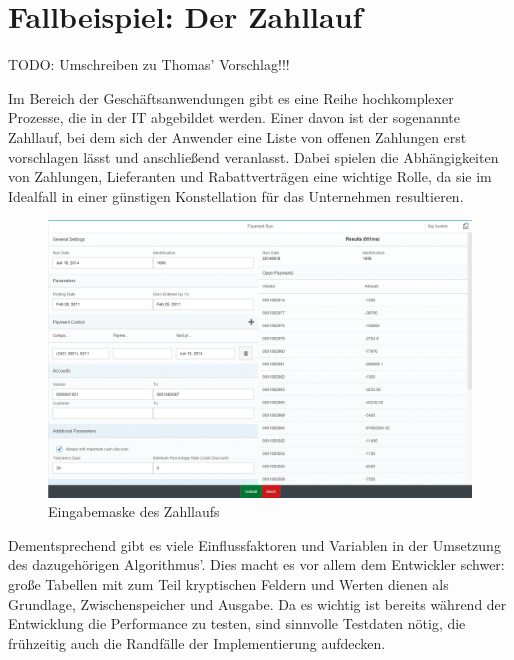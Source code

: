 \section{Fallbeispiel: Der Zahllauf}\label{chap:paymentrun}

TODO: Umschreiben zu Thomas' Vorschlag!!!


Im Bereich der Geschäftsanwendungen gibt es eine Reihe hochkomplexer Prozesse, die in der IT abgebildet werden.
Einer davon ist der sogenannte Zahllauf, bei dem sich der Anwender eine Liste von offenen Zahlungen erst vorschlagen lässt und anschließend veranlasst.
Dabei spielen die Abhängigkeiten von Zahlungen, Lieferanten und Rabattverträgen eine wichtige Rolle, da sie im Idealfall in einer günstigen Konstellation für das Unternehmen resultieren.

\begin{figure}[ht]
	\centering
  \includegraphics[width=1\textwidth]{figures/paymentrun.png}
	\caption{Eingabemaske des Zahllaufs}
	\label{fig:paymentrun}
\end{figure}

Dementsprechend gibt es viele Einflussfaktoren und Variablen in der Umsetzung des dazugehörigen Algorithmus'.
Dies macht es vor allem dem Entwickler schwer: große Tabellen mit zum Teil kryptischen Feldern und Werten dienen als Grundlage, Zwischenspeicher und Ausgabe.
Da es wichtig ist bereits während der Entwicklung die Performance zu testen, sind sinnvolle Testdaten nötig, die frühzeitig auch die Randfälle der Implementierung aufdecken.

